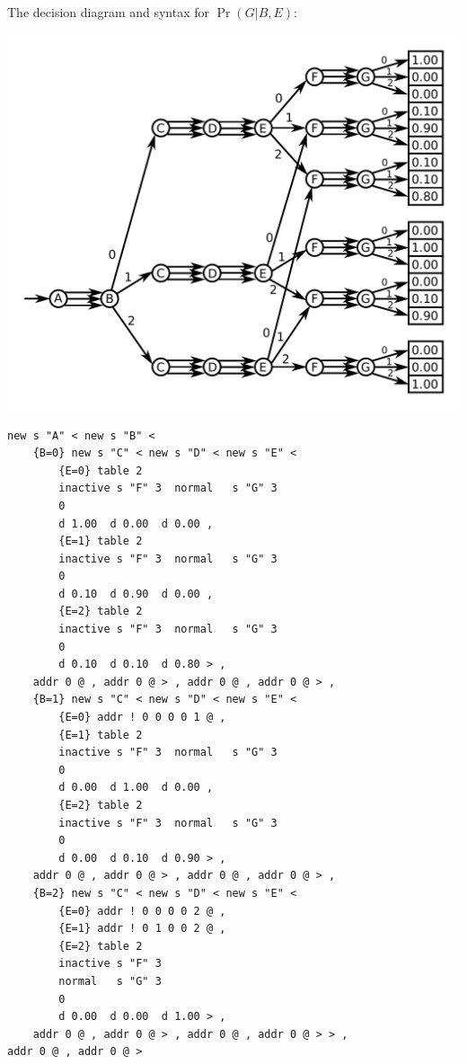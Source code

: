 \documentclass{article}
\begin{document}
\vspace{5mm}

\begin{minipage}{\textwidth}
The decision diagram and syntax for \(\Pr(G|B,E)\):

\includegraphics[width = \textwidth]{Pr(G)}
\end{minipage}

\begin{verbatim}
new s "A" < new s "B" < 
    {B=0} new s "C" < new s "D" < new s "E" < 
        {E=0} table 2
        inactive s "F" 3  normal   s "G" 3 
        0
        d 1.00  d 0.00  d 0.00 , 
        {E=1} table 2
        inactive s "F" 3  normal   s "G" 3 
        0
        d 0.10  d 0.90  d 0.00 , 
        {E=2} table 2
        inactive s "F" 3  normal   s "G" 3 
        0
        d 0.10  d 0.10  d 0.80 > , 
    addr 0 @ , addr 0 @ > , addr 0 @ , addr 0 @ > , 
    {B=1} new s "C" < new s "D" < new s "E" < 
        {E=0} addr ! 0 0 0 0 1 @ , 
        {E=1} table 2
        inactive s "F" 3  normal   s "G" 3 
        0
        d 0.00  d 1.00  d 0.00 , 
        {E=2} table 2
        inactive s "F" 3  normal   s "G" 3 
        0
        d 0.00  d 0.10  d 0.90 > , 
    addr 0 @ , addr 0 @ > , addr 0 @ , addr 0 @ > , 
    {B=2} new s "C" < new s "D" < new s "E" < 
        {E=0} addr ! 0 0 0 0 2 @ , 
        {E=1} addr ! 0 1 0 0 2 @ , 
        {E=2} table 2
        inactive s "F" 3 
        normal   s "G" 3 
        0
        d 0.00  d 0.00  d 1.00 > , 
    addr 0 @ , addr 0 @ > , addr 0 @ , addr 0 @ > > , 
addr 0 @ , addr 0 @ >        
\end{verbatim}
\end{document}
